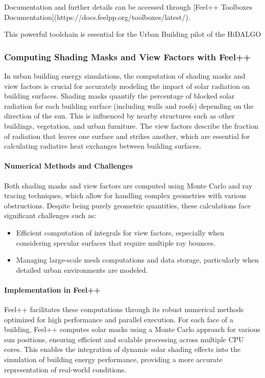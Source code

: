 \documentclass[runningheads]{llncs}
\begin{document}
Documentation and further details can be accessed through [Feel++ Toolboxes Documentation](https://docs.feelpp.org/toolboxes/latest/).

This powerful toolchain is essential for the Urban Building pilot of the HiDALGO

\subsubsection{Computing Shading Masks and View Factors with Feel++}

In urban building energy simulations, the computation of shading masks and view factors is crucial for accurately modeling the impact of solar radiation on building surfaces. Shading masks quantify the percentage of blocked solar radiation for each building surface (including walls and roofs) depending on the direction of the sun. This is influenced by nearby structures such as other buildings, vegetation, and urban furniture. The view factors describe the fraction of radiation that leaves one surface and strikes another, which are essential for calculating radiative heat exchanges between building surfaces.

\paragraph{Numerical Methods and Challenges}
Both shading masks and view factors are computed using Monte Carlo and ray tracing techniques, which allow for handling complex geometries with various obstructions. Despite being purely geometric quantities, these calculations face significant challenges such as:
\begin{itemize}
    \item Efficient computation of integrals for view factors, especially when considering specular surfaces that require multiple ray bounces.
    \item Managing large-scale mesh computations and data storage, particularly when detailed urban environments are modeled.
\end{itemize}

\paragraph{Implementation in Feel++}
Feel++ facilitates these computations through its robust numerical methods optimized for high performance and parallel execution. For each face of a building, Feel++ computes solar masks using a Monte Carlo approach for various sun positions, ensuring efficient and scalable processing across multiple CPU cores. This enables the integration of dynamic solar shading effects into the simulation of building energy performance, providing a more accurate representation of real-world conditions.
\end{document}
